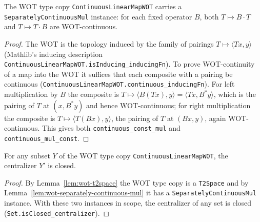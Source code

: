 \begin{lemma}
    \label{lem:wot-separately-continuous-mul}
    \leanok
    The WOT type copy \texttt{ContinuousLinearMapWOT} carries a
    \texttt{SeparatelyContinuousMul} instance: for each fixed operator $B$, both
    $T \mapsto B \cdot T$ and $T \mapsto T \cdot B$ are WOT-continuous.
\end{lemma}
\begin{proof}
    The WOT is the topology induced by the family of pairings
    $T \mapsto \langle T x, y\rangle$ (Mathlib's inducing description
    \texttt{ContinuousLinearMapWOT.isInducing\_inducingFn}). To prove WOT-continuity
    of a map into the WOT it suffices that each composite with a pairing be
    continuous (\texttt{ContinuousLinearMapWOT.continuous\_inducingFn}). For
    left multiplication by $B$ the composite is
    $T \mapsto \langle B(T x), y\rangle = \langle T x, B^* y\rangle$, which is the
    pairing of $T$ at $(x, B^* y)$ and hence WOT-continuous; for right
    multiplication the composite is $T \mapsto \langle T(B x), y\rangle$, the
    pairing of $T$ at $(B x, y)$, again WOT-continuous. This gives both
    \texttt{continuous\_const\_mul} and \texttt{continuous\_mul\_const}.
\end{proof}

\begin{lemma}
    \label{lem:wot-centralizer-closed}
    \leanok
    For any subset $Y$ of the WOT type copy \texttt{ContinuousLinearMapWOT}, the
    centralizer $Y'$ is closed.
\end{lemma}
\begin{proof}
    By Lemma~\ref{lem:wot-t2space} the WOT type copy is a \texttt{T2Space} and by
    Lemma~\ref{lem:wot-separately-continuous-mul} it has a
    \texttt{SeparatelyContinuousMul} instance. With these two instances in scope,
    the centralizer of any set is closed (\texttt{Set.isClosed\_centralizer}).
\end{proof}


